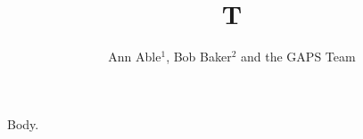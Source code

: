 \documentclass[aps,prd]{revtex4-1}
\begin{document}
\title{T}
\author{Ann Able$^{1}$, Bob Baker$^{2}$ and the GAPS Team}
\maketitle
Body.
\end{document}
